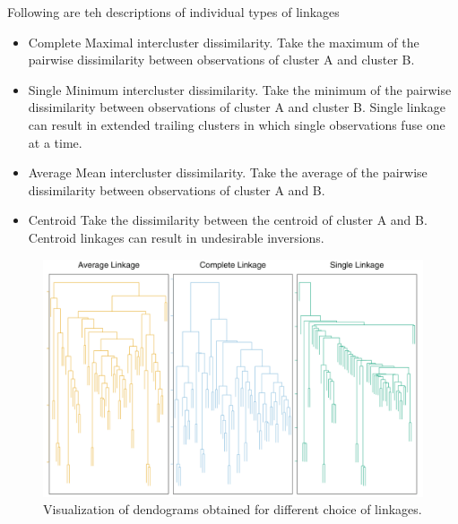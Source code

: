 \documentclass[11pt, a4paper]{article}
\begin{document}
    Following are teh descriptions of individual types of linkages
    \begin{itemize}
         \item Complete\newline
         Maximal intercluster dissimilarity. Take the maximum of the pairwise dissimilarity between observations of cluster A and cluster B.
         \item Single\newline
         Minimum intercluster dissimilarity. Take the minimum of the pairwise dissimilarity between observations of cluster A and cluster B.\newline
         Single linkage can result in extended trailing clusters in which single observations fuse one at a time.
         \item Average\newline
         Mean intercluster dissimilarity. Take the average of the pairwise dissimilarity between observations of cluster A and B.
         \item Centroid\newline
         Take the dissimilarity between the centroid of cluster A and B. Centroid linkages can result in undesirable inversions.
    \end{itemize}


    \begin{figure}[h]
    \includegraphics[scale=0.5]{dendogram_linkages}
    \centering
    \caption{Visualization of dendograms obtained for different choice of linkages.}
    \label{fig:dendogram_linkages} %
    \end{figure}
\end{document}
